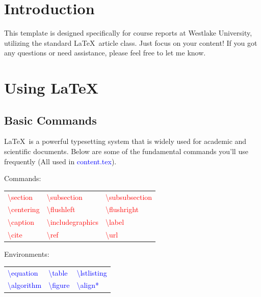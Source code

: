 \section{Introduction}
This template is designed specifically for course reports at Westlake University, utilizing the standard \LaTeX\ article class. Just focus on your content! If you got any questions or need assistance, please feel free to let me know.

\section{Using \LaTeX}
\subsection{Basic Commands}
\LaTeX\ is a powerful typesetting system that is widely used for academic and scientific documents. Below are some of the fundamental commands you'll use frequently (All used in \textcolor{blue}{content.tex}).

Commands: 
\begin{table}[h]
    \centering
    \begin{tabular}{lll}
        \textcolor{red}{\textbackslash section}         & \textcolor{red}{\textbackslash subsection}      & \textcolor{red}{\textbackslash subsubsection}   \\
        \textcolor{red}{\textbackslash centering}       & \textcolor{red}{\textbackslash flushleft}       & \textcolor{red}{\textbackslash flushright}      \\
        \textcolor{red}{\textbackslash caption}         & \textcolor{red}{\textbackslash includegraphics} & \textcolor{red}{\textbackslash label}           \\
        \textcolor{red}{\textbackslash cite}            & \textcolor{red}{\textbackslash ref}             & \textcolor{red}{\textbackslash url}             \\
    \end{tabular}
\end{table}

Environments:
\begin{table}[h]
    \centering
    \begin{tabular}{lll}
        \textcolor{blue}{\textbackslash equation}    & \textcolor{blue}{\textbackslash table}       & \textcolor{blue}{\textbackslash lstlisting}  \\
        \textcolor{blue}{\textbackslash algorithm}   & \textcolor{blue}{\textbackslash figure}      & \textcolor{blue}{\textbackslash align*}      \\
    \end{tabular}
\end{table}

